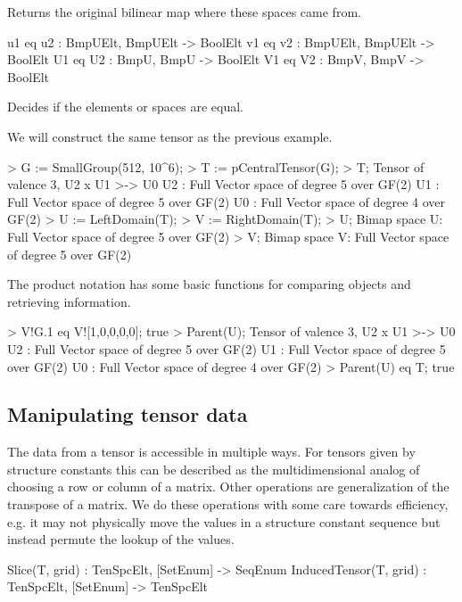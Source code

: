 Returns the original bilinear map where these spaces came from.

\begin{intrinsics}
u1 eq u2 : BmpUElt, BmpUElt -> BoolElt
v1 eq v2 : BmpUElt, BmpUElt -> BoolElt
U1 eq U2 : BmpU, BmpU -> BoolElt
V1 eq V2 : BmpV, BmpV -> BoolElt
\end{intrinsics}

Decides if the elements or spaces are equal.

\begin{example}[BimapProduct2]

We will construct the same tensor as the previous example.
\begin{code}
> G := SmallGroup(512, 10^6);
> T := pCentralTensor(G);
> T;
Tensor of valence 3, U2 x U1 >-> U0
U2 : Full Vector space of degree 5 over GF(2)
U1 : Full Vector space of degree 5 over GF(2)
U0 : Full Vector space of degree 4 over GF(2)
> U := LeftDomain(T);
> V := RightDomain(T);
> U;
Bimap space U: Full Vector space of degree 5 over GF(2)
> V;
Bimap space V: Full Vector space of degree 5 over GF(2)
\end{code}

The product notation has some basic functions for comparing objects and retrieving information.
\begin{code}
> V!G.1 eq V![1,0,0,0,0];
true
> Parent(U);
Tensor of valence 3, U2 x U1 >-> U0
U2 : Full Vector space of degree 5 over GF(2)
U1 : Full Vector space of degree 5 over GF(2)
U0 : Full Vector space of degree 4 over GF(2)
> Parent(U) eq T;
true
\end{code}
\end{example}


\subsection{Manipulating tensor data}
The data from a tensor is accessible in multiple ways.   For 
tensors given by structure constants this can be described as the 
multidimensional analog of choosing a row or column of a matrix.
Other operations are generalization of the transpose of a matrix.
We do these operations with some care towards efficiency,
e.g. it may not physically move the values in a structure constant
sequence but instead permute the lookup of the values.


\begin{intrinsics}
Slice(T, grid) : TenSpcElt, [SetEnum] -> SeqEnum
InducedTensor(T, grid) : TenSpcElt, [SetEnum] -> TenSpcElt
\end{intrinsics}

